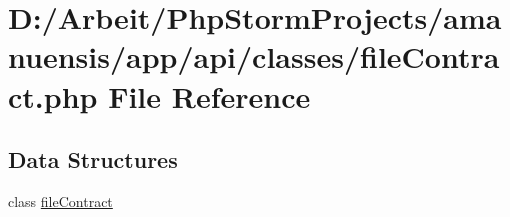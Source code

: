 \hypertarget{a00059}{}\section{D\+:/\+Arbeit/\+Php\+Storm\+Projects/amanuensis/app/api/classes/file\+Contract.php File Reference}
\label{a00059}
\subsection*{Data Structures}
\begin{DoxyCompactItemize}
\item 
class \hyperlink{a00023}{file\+Contract}
\end{DoxyCompactItemize}
